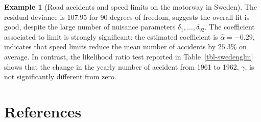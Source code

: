 \documentclass[
  11pt,
  letterpaper,
]{scrbook}
\theoremstyle{definition}
\theoremstyle{definition}
\newtheorem{example}{Example}[chapter]
\theoremstyle{remark}
\begin{document}
\begin{example}[Road accidents and speed limits on the motorway in
Sweden]
\begin{table}

\caption{\label{tbl-swedenglm}Analysis of deviance table (Type 3
decomposition) for the Poisson regression model fitted to the Sweden
traffic restrictions data: the table gives the \(p\)-value for
likelihood ratio tests comparing the full model including all covariates
with models in which a single explanatory is removed.}


\end{table}%

The residual deviance is 107.95 for 90 degrees of freedom, suggests the
overall fit is good, despite the large number of nuisance parameters
\(\delta_1, \ldots, \delta_{92}\). The coefficient associated to limit
is strongly significant: the estimated coefficient is
\(\widehat{\alpha}=-0.29\), indicates that speed limits reduce the mean
number of accidents by \(25.3\)\% on average. In contrast, the
likelihood ratio test reported in Table~\ref{tbl-swedenglm} shows that
the change in the yearly number of accident from 1961 to 1962,
\(\gamma\), is not significantly different from zero.

\end{example}


\chapter{References}\label{references}
\end{document}
